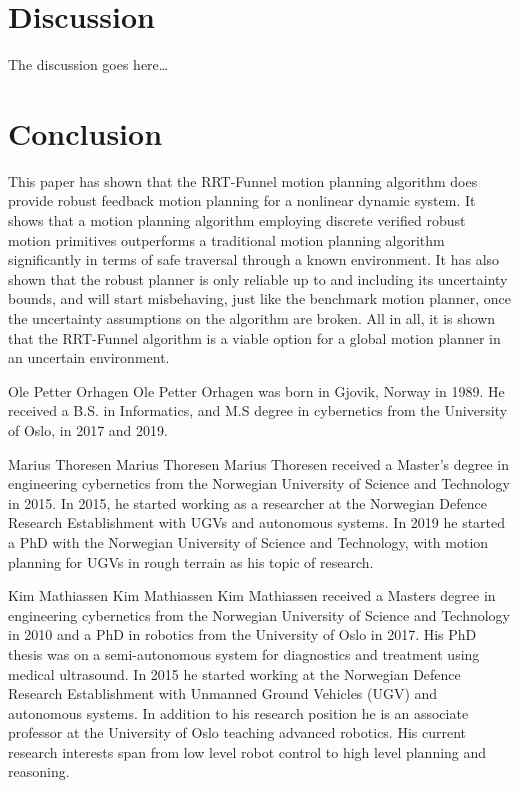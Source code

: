 \documentclass{IEEEtran}
\newcommand{\rrtfunnel}{RRT-Funnel}
\newcommand{\0}{\mathbf{0}}
\newcommand{\1}{\mathbf{1}}
\begin{document}
\section{Discussion}

The discussion goes here\ldots

\section{Conclusion}

This paper has shown that the \rrtfunnel{} motion planning algorithm does
provide robust feedback motion planning for a nonlinear dynamic system. It shows
that a motion planning algorithm employing discrete verified robust motion
primitives outperforms a traditional motion planning algorithm significantly in
terms of safe traversal through a known environment. It has also shown that the
robust planner is only reliable up to and including its uncertainty bounds, and
will start misbehaving, just like the benchmark motion planner, once the
uncertainty assumptions on the algorithm are broken. All in all, it is shown
that the \rrtfunnel{} algorithm is a viable option for a global motion planner
in an uncertain environment.




\begin{IEEEbiographynophoto}{Ole Petter Orhagen}
  Ole Petter Orhagen was born in Gjovik, Norway in 1989. He received a B.S. in
  Informatics, and M.S degree in cybernetics from the University of Oslo, in
  2017 and 2019.
\end{IEEEbiographynophoto}

\begin{IEEEbiographynophoto}{Marius Thoresen}
  Marius Thoresen Marius Thoresen received a Master’s degree in engineering
  cybernetics from the Norwegian University of Science and Technology in 2015.
  In 2015, he started working as a researcher at the Norwegian Defence Research
  Establishment with UGVs and autonomous systems. In 2019 he started a PhD with
  the Norwegian University of Science and Technology, with motion planning for
  UGVs in rough terrain as his topic of research.
\end{IEEEbiographynophoto}

\begin{IEEEbiographynophoto}{Kim Mathiassen}
  Kim Mathiassen Kim Mathiassen received a
  Masters degree in engineering cybernetics from
  the Norwegian University of Science and Technology in 2010 and a PhD in robotics from the
  University of Oslo in 2017. His PhD thesis was
  on a semi-autonomous system for diagnostics
  and treatment using medical ultrasound.
  In 2015 he started working at the Norwegian Defence Research Establishment with
  Unmanned Ground Vehicles (UGV) and autonomous systems. In addition to his research
  position he is an associate professor at the University of Oslo teaching
  advanced robotics. His current research interests span from low level
  robot control to high level planning and reasoning.
 \end{IEEEbiographynophoto}
\end{document}
